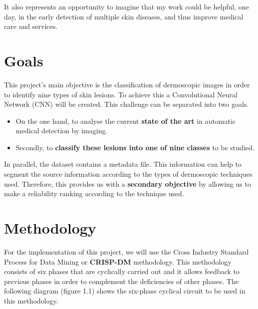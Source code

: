 It also represents an opportunity to imagine that my work could be helpful, one day, in the early detection of multiple skin diseases, and thus improve medical care and services.



\section{Goals}


This project's main objective is the classification of dermoscopic images in order to identify nine types of skin lesions. To achieve this a Convolutional Neural Network (CNN) will be created. This challenge can be separated into two goals.

\begin{itemize}
    \item On the one hand, to analyse the current \textbf{state of the art} in automatic medical detection by imaging.
    \item Secondly, to \textbf{classify these lesions into one of nine classes} to be studied.
\end{itemize}

In parallel, the dataset contains a metadata file. This information can help to segment the source information according to the types of dermoscopic techniques used. Therefore, this provides us with a \textbf{secondary objective} by allowing us to make a reliability ranking according to the technique used. 


\section{Methodology}


For the implementation of this project, we will use the Cross Industry Standard Process for Data Mining or \textbf{CRISP-DM} methodology. This methodology consists of six phases that are cyclically carried out and it allows feedback to previous phases in order to complement the deficiencies of other phases. The following diagram (figure 1.1) shows the six-phase cyclical circuit to be used in this methodology.

